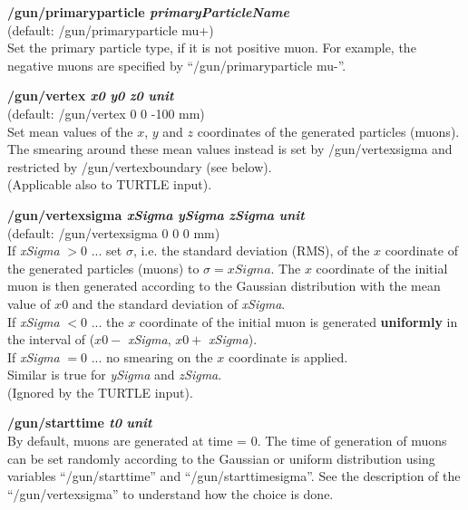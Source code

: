\documentclass[twoside]{dis04}
\begin{document}
\begin{description}
\item{\bf /gun/primaryparticle \emph{primaryParticleName}}\\
        (default: /gun/primaryparticle mu+)\\
	Set the primary particle type, if it is not positive muon.  For example, the negative muons
	are specified by ``/gun/primaryparticle mu-''.

\item{\bf /gun/vertex \emph{x0} \emph{y0} \emph{z0} \emph{unit}}\\
	(default: /gun/vertex 0 0 -100 mm) \\
	Set mean values of the $x$, $y$ and $z$ coordinates of the generated particles (muons).
	The smearing around these mean values instead is set by /gun/vertexsigma and
        restricted by /gun/vertexboundary (see below).\\
	(Applicable also to TURTLE input).

\item{\bf /gun/vertexsigma \emph{xSigma} \emph{ySigma} \emph{zSigma} \emph{unit}}\\
	(default: /gun/vertexsigma 0 0 0 mm) \\
	If {\it xSigma} $>0$ ...  set $\sigma$, i.e. the standard deviation (RMS), of the $x$ coordinate
	of the generated particles (muons) to $\sigma=xSigma$. The $x$ coordinate of the initial
        muon is then generated according to the Gaussian distribution with the mean value of $x0$
	and the standard deviation of {\it xSigma}. \\
	If {\it xSigma} $<0$ ... the $x$ coordinate of the initial
        muon is generated {\bf uniformly} in the interval of ($x0-$ {\it xSigma}, $x0+$ {\it xSigma}).\\
	If {\it xSigma} $= 0$ ... no smearing on the $x$ coordinate is applied.\\
	Similar is true for {\it ySigma} and {\it zSigma}. \\
	(Ignored by the TURTLE input).	

\item{\bf /gun/starttime \emph{t0} \emph{unit}}\\
	By default, muons are generated at time = 0.  The time of generation of muons can be
        set randomly according to the Gaussian or uniform distribution using variables
	``/gun/starttime'' and ``/gun/starttimesigma''.  See the description of the
	``/gun/vertexsigma'' to understand how the choice is done.


\end{description}
\end{document}
